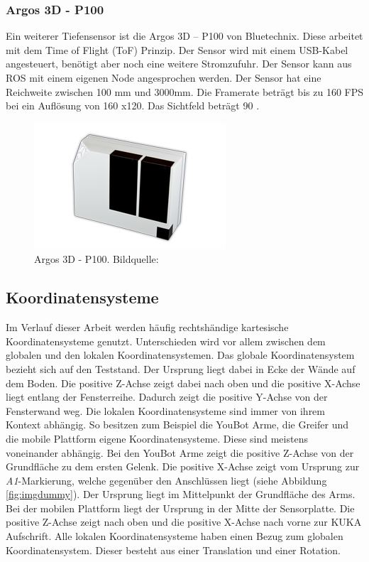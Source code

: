 \subsubsection{Argos 3D - P100}
Ein weiterer Tiefensensor ist die Argos 3D – P100 von Bluetechnix. Diese arbeitet mit dem Time of Flight (ToF) Prinzip. Der Sensor wird mit einem USB-Kabel angesteuert, benötigt aber noch eine weitere Stromzufuhr. Der Sensor kann aus ROS mit einem eigenen Node angesprochen werden. Der Sensor hat eine Reichweite zwischen 100 mm und 3000mm. Die Framerate beträgt bis zu 160 FPS bei ein Auflösung von 160 x120. Das Sichtfeld beträgt 90 \textdegree { }\citep{bluetechnix2015}.

\begin{figure}[H]
	\centering
	\includegraphics[scale=0.8]{fig/argos3d}   
	\caption[Argos 3D - P100]{Argos 3D - P100. Bildquelle: \cite{bluetechnix2015}}
	\label{fig:aufbau-argos3d}
\end{figure}

\subsection{Koordinatensysteme}
Im Verlauf dieser Arbeit werden häufig rechtshändige kartesische Koordinatensysteme genutzt. Unterschieden wird vor allem zwischen dem globalen und den lokalen Koordinatensystemen. Das globale Koordinatensystem bezieht sich auf den Teststand. Der Ursprung liegt dabei in Ecke der Wände auf dem Boden. Die positive Z-Achse zeigt dabei nach oben und die positive X-Achse liegt entlang der Fensterreihe. Dadurch zeigt die positive Y-Achse von der Fensterwand weg. Die lokalen Koordinatensysteme sind immer von ihrem Kontext abhängig. So besitzen zum Beispiel die YouBot Arme, die Greifer und die mobile Plattform eigene Koordinatensysteme. Diese sind meistens voneinander abhängig. Bei den YouBot Arme zeigt die positive Z-Achse von der Grundfläche zu dem ersten Gelenk. Die positive X-Achse zeigt vom Ursprung zur \textit{A1}-Markierung, welche gegenüber den Anschlüssen liegt (siehe Abbildung \ref{fig:imgdummy}). Der Ursprung liegt im Mittelpunkt der Grundfläche des Arms. Bei der mobilen Plattform liegt der Ursprung in der Mitte der Sensorplatte. Die positive Z-Achse zeigt nach oben und die positive X-Achse nach vorne zur KUKA Aufschrift. Alle lokalen Koordinatensysteme haben einen Bezug zum globalen Koordinatensystem. Dieser besteht aus einer Translation und einer Rotation.

